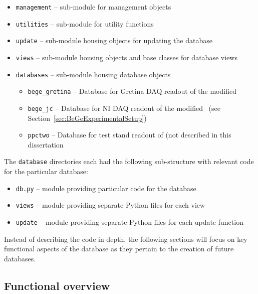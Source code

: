 			\lstset{language=sh}
			\begin{itemize}
		  	  	\setlength{\itemsep}{0.5pt}
		  	  	\setlength{\parskip}{0pt}
		  	  	\setlength{\parsep}{0pt}
				\item[] \lstinline!management! -- sub-module for management objects 
				\item[] \lstinline!utilities! -- sub-module for utility functions 
				\item[] \lstinline!update! -- sub-module housing objects for updating the database 
				\item[] \lstinline!views! -- sub-module housing objects and base classes for database views 
				\item[] \lstinline!databases! -- sub-module housing database objects 
				\begin{itemize}
		  	  		\setlength{\itemsep}{0.5pt}
		  	  		\setlength{\parskip}{0pt}
		  	  		\setlength{\parsep}{0pt}
					\item[] \lstinline!bege_gretina! -- Database for Gretina DAQ readout of the modified \bege
					\item[] \lstinline!bege_jc! -- Database for NI DAQ readout of the modified \bege~(see Section~\ref{sec:BeGeExperimentalSetup}) 
					\item[] \lstinline!ppctwo! -- Database for test stand readout of  (not described in this dissertation 
				\end{itemize}
			\end{itemize}
The \lstinline!database! directories each had the following sub-structure with relevant code for the particular database:
			\begin{itemize}
		  	  	\setlength{\itemsep}{0.5pt}
		  	  	\setlength{\parskip}{0pt}
		  	  	\setlength{\parsep}{0pt}
				\item[] \lstinline!db.py! -- module providing particular code for the database 
				\item[] \lstinline!views! -- module providing separate Python files for each view 
				\item[] \lstinline!update! -- module providing separate Python files for each update function 
			\end{itemize}
	
Instead of describing the code in
depth, the following sections will focus on key functional aspects of the
database as they pertain to the creation of future databases.  

		\subsection{Functional overview}
		
